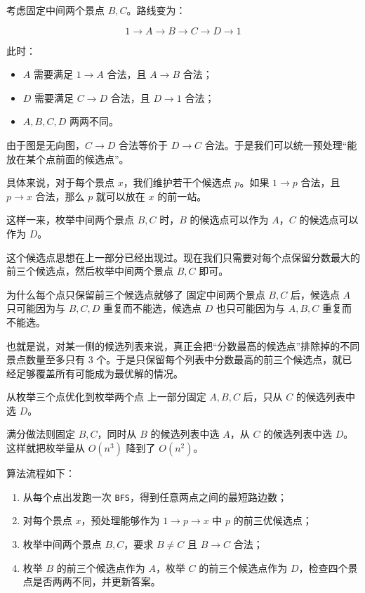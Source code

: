 \documentclass{book}
\newcommand{\code}[1]{\colorbox{codebg}{\texttt{#1}}}  %
\begin{document}
考虑固定中间两个景点 $B,C$。路线变为：

$$
1\to A\to B\to C\to D\to 1
$$

此时：

\begin{itemize}[leftmargin=2em,itemsep=1pt,topsep=2pt,parsep=0pt,partopsep=0pt]
    \item $A$ 需要满足 $1\to A$ 合法，且 $A\to B$ 合法；
    \item $D$ 需要满足 $C\to D$ 合法，且 $D\to 1$ 合法；
    \item $A,B,C,D$ 两两不同。
\end{itemize}

由于图是无向图，$C\to D$ 合法等价于 $D\to C$ 合法。于是我们可以统一预处理“能放在某个点前面的候选点”。

具体来说，对于每个景点 $x$，我们维护若干个候选点 $p$。如果 $1\to p$ 合法，且 $p\to x$ 合法，那么 $p$ 就可以放在 $x$ 的前一站。

这样一来，枚举中间两个景点 $B,C$ 时，$B$ 的候选点可以作为 $A$，$C$ 的候选点可以作为 $D$。

这个候选点思想在上一部分已经出现过。现在我们只需要对每个点保留分数最大的前三个候选点，然后枚举中间两个景点 $B,C$ 即可。

\begin{keybox}{为什么每个点只保留前三个候选点就够了}
固定中间两个景点 $B,C$ 后，候选点 $A$ 只可能因为与 $B,C,D$ 重复而不能选，候选点 $D$ 也只可能因为与 $A,B,C$ 重复而不能选。

也就是说，对某一侧的候选列表来说，真正会把“分数最高的候选点”排除掉的不同景点数量至多只有 $3$ 个。于是只保留每个列表中分数最高的前三个候选点，就已经足够覆盖所有可能成为最优解的情况。
\end{keybox}

\begin{keybox}{从枚举三个点优化到枚举两个点}
上一部分固定 $A,B,C$ 后，只从 $C$ 的候选列表中选 $D$。

满分做法则固定 $B,C$，同时从 $B$ 的候选列表中选 $A$，从 $C$ 的候选列表中选 $D$。这样就把枚举量从 $O(n^3)$ 降到了 $O(n^2)$。
\end{keybox}

算法流程如下：

\begin{enumerate}[leftmargin=2em,itemsep=1pt,topsep=2pt,parsep=0pt,partopsep=0pt]
    \item 从每个点出发跑一次 \code{BFS}，得到任意两点之间的最短路边数；
    \item 对每个景点 $x$，预处理能够作为 $1\to p\to x$ 中 $p$ 的前三优候选点；
    \item 枚举中间两个景点 $B,C$，要求 $B\ne C$ 且 $B\to C$ 合法；
    \item 枚举 $B$ 的前三个候选点作为 $A$，枚举 $C$ 的前三个候选点作为 $D$，检查四个景点是否两两不同，并更新答案。
\end{enumerate}
\end{document}
